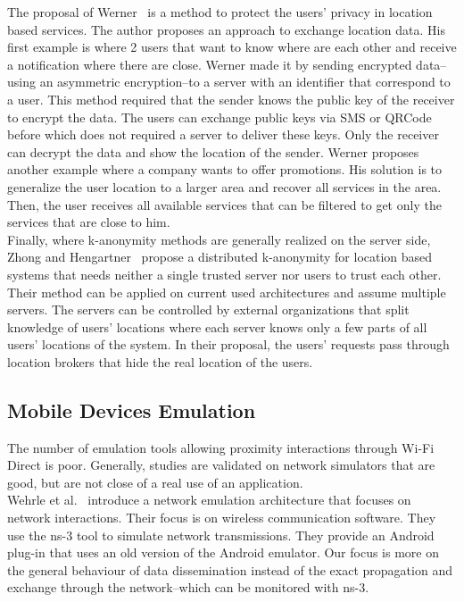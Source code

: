 The proposal of Werner~\cite{DBLP:conf/mobisec/Werner10} is a method to protect the users' privacy in location based services.
The author proposes an approach to exchange location data.
His first example is where 2 users that want to know where are each other and receive a notification where there are close.
Werner made it by sending encrypted data--using an asymmetric encryption--to a server with an identifier that correspond to a user.
This method required that the sender knows the public key of the receiver to encrypt the data.  
The users can exchange public keys via SMS or QRCode before which does not required a server to deliver these keys.
Only the receiver can decrypt the data and show the location of the sender.
Werner proposes another example where a company wants to offer promotions.
His solution is to generalize the user location to a larger area and recover all services in the area.
Then, the user receives all available services that can be filtered to get only the services that are close to him.
\\

Finally, where k-anonymity methods are generally realized on the server side, Zhong and Hengartner~\cite{DBLP:conf/percom/ZhongH09} propose a distributed k-anonymity for location based systems that needs neither a single trusted server nor users to trust each other.
Their method can be applied on current used architectures and assume multiple servers.
The servers can be controlled by external organizations that split knowledge of users' locations where each server knows only a few parts of all users' locations of the system.
In their proposal, the users' requests pass through location brokers that hide the real location of the users.

\subsection{Mobile Devices Emulation}

The number of emulation tools allowing proximity interactions through Wi-Fi Direct is poor.
Generally, studies are validated on network simulators that are good, but are not close of a real use of an application.
\\

Wehrle et al.~\cite{DBLP:conf/simutools/WeingartnerLW11} introduce a network emulation architecture that focuses on network interactions.
Their focus is on wireless communication software.
They use the ns-3 tool to simulate network transmissions.
They provide an Android plug-in that uses an old version of the Android emulator.
Our focus is more on the general behaviour of data dissemination instead of the exact propagation and exchange through the network--which can be monitored with ns-3.
\\

